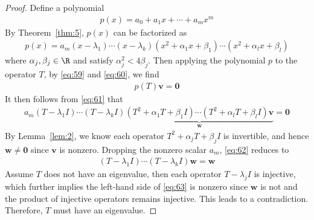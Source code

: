 \documentclass[thmcnt=section, color=blue, 12pt]{my-elegantbook}
\begin{document}
\begin{proof}
	Define a polynomial 
	\begin{align}
		p(x) = a_0 + a_1 x + \cdots + a_m x^m
		\label{eq:60}
	\end{align}
	By Theorem~\ref{thm:5}, $p(x)$ can be factorized as 
	\begin{align}
		p(x) = a_m (x - \lambda_1) \cdots (x - \lambda_k)
		(x^2 + \alpha_1 x + \beta_1) \cdots (x^2 + \alpha_l x + \beta_l)
		\label{eq:61}
	\end{align}
	where $\alpha_j, \beta_j \in \R$ and satisfy $\alpha_j^2 < 4 \beta_j$.
	Then applying the polynomial $p$ to the operator $T$,
	by \eqref{eq:59} and \eqref{eq:60}, we find
	\begin{align*}
		p(T) \mathbf{v} = \mathbf{0}
	\end{align*}
	It then follows from \eqref{eq:61} that 
	\begin{align}
		a_m (T - \lambda_1 I) \cdots (T - \lambda_k I)
		\underbrace{(T^2 + \alpha_1 T + \beta_1 I) 
		\cdots (T^2 + \alpha_l T + \beta_l I) \mathbf{v}}_{\mathbf{w}}
		= \mathbf{0}
		\label{eq:62}
	\end{align}
	By Lemma~\ref{lem:2}, we know each 
	operator $T^2 + \alpha_j T + \beta_j I$ is invertible,
	and hence $\mathbf{w} \neq \mathbf{0}$ since $\mathbf{v}$ is nonzero.
	Dropping the nonzero scalar $a_m$, \eqref{eq:62} reduces to 
	\begin{align}
		(T - \lambda_1 I) \cdots (T - \lambda_k I) \mathbf{w} = \mathbf{w}
		\label{eq:63}
	\end{align}
	Assume $T$ does not have an eigenvalue, then each 
	operator $T - \lambda_j I$ is injective, 
	which further implies the left-hand side of \eqref{eq:63} is nonzero
	since $\mathbf{w}$ is not and the product 
	of injective operators remains injective.
	This leads to a contradiction.
	Therefore, $T$ must have an eigenvalue.
\end{proof}



\printbibliography[heading=bibintoc, title=References]

\printindex

\end{document}
